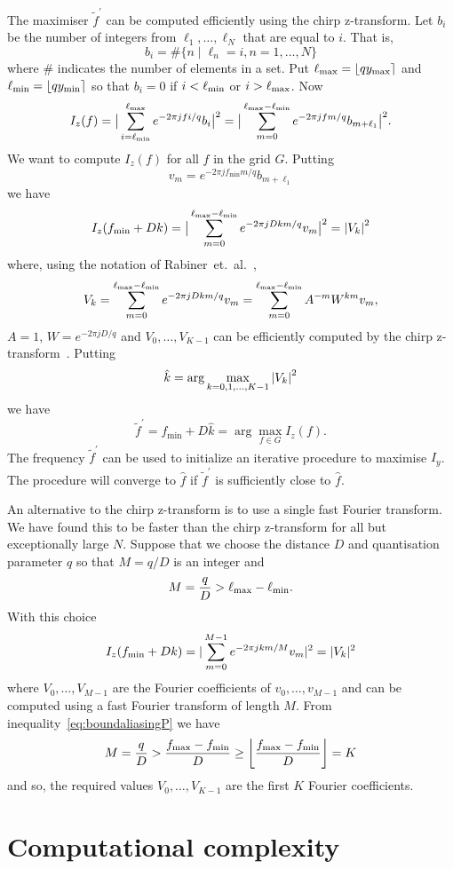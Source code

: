 \documentclass[10pt,twocolumn,twoside]{IEEEtran}
\begin{document}
The maximiser $\widetilde{f}^\prime$ can be computed efficiently using the chirp z-transform.  Let $b_i$ be the number of integers from $\ell_1,\dots,\ell_N$ that are equal to $i$.  That is,
\[
b_i= \#\{ n \mid \ell_n = i, n = 1,\dots, N\}
\]
where $\#$ indicates the number of elements in a set.  Put $\ell_{\text{max}} = {\left\lfloor q y_{\text{max}} \right\rceil}$ and $\ell_{\text{min}} = {\left\lfloor q y_{\text{min}} \right\rceil}$ so that $b_i = 0$ if $i < \ell_{\text{min}}$ or $i > \ell_{\text{max}}$.  Now
\[
I_z(f) = \big\vert  \sum_{i = \ell_{\text{min}}}^{\ell_{\text{max}}} e^{ -2\pi j f i/q} b_i  \big\vert^2 = \big\vert  \sum_{m = 0}^{\ell_{\text{max}}-\ell_{\text{min}}} e^{ -2\pi j f m/q} b_{m+\ell_1}  \big\vert^2.
\]
We want to compute $I_z(f)$ for all $f$ in the grid $G$.  Putting
\[
v_m = e^{ -2\pi j f_{\text{min}}m/q} b_{m+\ell_1}
\]
we have
\[
I_z(f_{\text{min}} + Dk) = \big\vert  \sum_{m = 0}^{\ell_{\text{max}}-\ell_{\text{min}}} e^{ -2\pi j Dk m/q} v_m  \big\vert^2 = \left\vert V_k \right\vert^2
\]   
where, using the notation of Rabiner~et.~al.~\cite[eq.~(10)]{Rabiner1969},
\[
V_k = \sum_{m = 0}^{\ell_{\text{max}}-\ell_{\text{min}}} e^{ -2\pi j Dk m/q} v_m = \sum_{m=0}^{\ell_{\text{max}}-\ell_{\text{min}}} A^{-m} W^{km} v_m,
\]
$A = 1$, $W = e^{ -2\pi j D/q}$ and $V_0,\dots,V_{K-1}$ can be efficiently computed by the chirp z-transform~\cite{Rabiner1969}.  Putting
\[
\hat{k} = \arg\max_{k = 0,1,\dots,K-1} \left\vert  V_k  \right\vert^2
\]
we have
\[ 
\widetilde{f}^\prime = f_{\text{min}} + D\hat{k} = \arg\max_{f \in G} I_z(f).
\]
The frequency $\widetilde{f}^\prime$ can be used to initialize an iterative procedure to maximise $I_y$.  The procedure will converge to $\hat{f}$ if $\widetilde{f}^\prime$ is sufficiently close to $\hat{f}$.

An alternative to the chirp z-transform is to use a single fast Fourier transform.  We have found this to be faster than the chirp z-transform for all but exceptionally large $N$.  Suppose that we choose the distance $D$ and quantisation parameter $q$ so that $M = q/D$ is an integer and
\[
M = \frac{q}{D} > \ell_{\text{max}}-\ell_{\text{min}}.
\]
With this choice
\[
I_z(f_{\text{min}} + Dk) = \vert \sum_{m = 0}^{M-1} e^{-2\pi j k m/M} v_m \vert^2 = \vert V_k \vert^2
\]
where $V_0,\dots,V_{M-1}$ are the Fourier coefficients of $v_0,\dots,v_{M-1}$ and can be computed using a fast Fourier transform of length $M$.  From inequality~\eqref{eq:boundaliasingP} we have
\[
M = \frac{q}{D} > \frac{f_{\text{max}} - f_{\text{min}}}{D} \geq {\left\lfloor \frac{f_{\text{max}} - f_{\text{min}}}{D} \right\rfloor} = K
\]
and so, the required values  $V_0,\dots,V_{K-1}$ are the first $K$ Fourier coefficients.


\section{Computational complexity}\label{sec:comp-compl}
\end{document}
